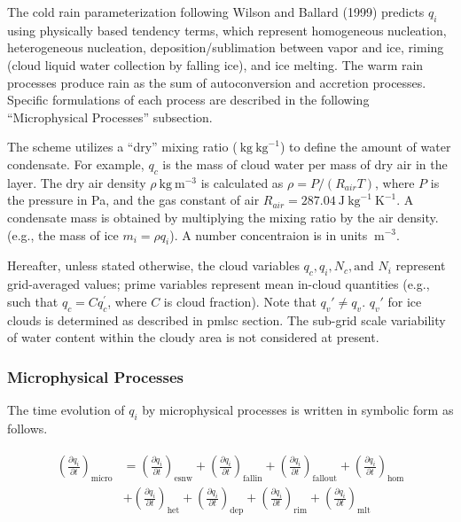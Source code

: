 The cold rain parameterization following Wilson and Ballard (1999) predicts \(q_i\) using physically based tendency terms, which represent homogeneous nucleation, heterogeneous nucleation,
deposition/sublimation between vapor and ice, riming (cloud liquid water collection by falling ice), and ice melting. The warm rain processes produce rain as the sum of autoconversion and accretion
processes. Specific formulations of each process are described in the following ``Microphysical Processes'' subsection.

The scheme utilizes a ``dry'' mixing ratio (\(\mathrm{~kg} \mathrm{~kg}^{-1}\)) to define the amount of water condensate. For example, \(q_c\) is the mass of cloud water per mass of dry air in the
layer. The dry air density \(\rho \mathrm{~kg} \mathrm{~m}^{-3}\) is calculated as \(\rho =P/(R_{air}T)\), where \(P\) is the pressure in Pa, and the gas constant of air
\(R_{air} =287.04 \mathrm{~J} \mathrm{~kg}^{-1} \mathrm{~K}^{-1}\). A condensate mass is obtained by multiplying the mixing ratio by the air density. (e.g., the mass of ice \(m_i = \rho q_i\)). A
number concentraion is in units \(\mathrm{~m}^{-3}\).

Hereafter, unless stated otherwise, the cloud variables \(q_c, q_i,N_c, \text{and } N_i\) represent grid-averaged values; prime variables represent mean in-cloud quantities (e.g., such that
\(q_c = C q_c^{'}\), where \(C\) is cloud fraction). Note that \(q_v{'} \neq q_v\). \(q_v{'}\) for ice clouds is determined as described in pmlsc section. The sub-grid scale variability of water
content within the cloudy area is not considered at present.

\hypertarget{microphysical-processes}{%
\subsubsection{Microphysical Processes}\label{microphysical-processes}}

The time evolution of \(q_i\) by microphysical processes is written in symbolic form as follows.

\begin{eqnarray}
\begin{split}
\left(\frac{\partial q_i}{\partial t}\right)_{\text {micro}}
&=\left(\frac{\partial q_i}{\partial t}\right)_{\text {esnw}}
+\left(\frac{\partial q_i}{\partial t}\right)_{\text {fallin}}
+\left(\frac{\partial q_i}{\partial t}\right)_{\text {fallout}}
+\left(\frac{\partial q_i}{\partial t}\right)_{\text {hom}}\\
&+\left(\frac{\partial q_i}{\partial t}\right)_{\text {het}}
+\left(\frac{\partial q_i}{\partial t}\right)_{\text {dep}}
+\left(\frac{\partial q_i}{\partial t}\right)_{\text {rim}}
+\left(\frac{\partial q_i}{\partial t}\right)_{\text {mlt}}
\end{split}
\end{eqnarray}

